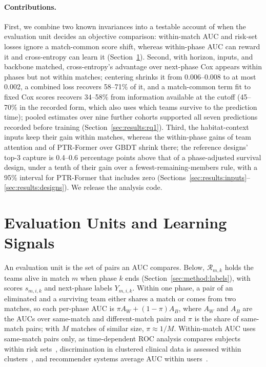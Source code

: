 \documentclass[sigconf,anonymous,nonacm]{acmart}
\begin{document}
\paragraph{Contributions.}
First, we combine two known invariances into a testable account of when the evaluation unit decides an objective comparison: within-match AUC and risk-set losses ignore a match-common score shift, whereas within-phase AUC can reward it and cross-entropy can learn it (Section~\ref{sec:account}). Second, with horizon, inputs, and backbone matched, cross-entropy's advantage over next-phase Cox appears within phases but not within matches; centering shrinks it from 0.006--0.008 to at most 0.002, a combined loss recovers 58--71\% of it, and a match-common term fit to fixed Cox scores recovers 34--58\% from information available at the cutoff (45--70\% in the recorded form, which also uses which teams survive to the prediction time); pooled estimates over nine further cohorts supported all seven predictions recorded before training (Section~\ref{sec:results:rq1}). Third, the habitat-context inputs keep their gain within matches, whereas the within-phase gains of team attention and of PTR-Former over GBDT shrink there; the reference designs' top-3 capture is 0.4--0.6 percentage points above that of a phase-adjusted survival design, under a tenth of their gain over a fewest-remaining-members rule, with a 95\% interval for PTR-Former that includes zero (Sections~\ref{sec:results:inputs}--\ref{sec:results:designs}). We release the analysis code.

\section{Evaluation Units and Learning Signals}
\label{sec:account}
An evaluation unit is the set of pairs an AUC compares. Below, $\mathcal{R}_{m,k}$ holds the teams alive in match $m$ when phase $k$ ends (Section~\ref{sec:method:labels}), with scores $s_{m,i,k}$ and next-phase labels $Y_{m,i,k}$. Within one phase, a pair of an eliminated and a surviving team either shares a match or comes from two matches, so each per-phase AUC is $\pi A_W+(1-\pi)A_B$, where $A_W$ and $A_B$ are the AUCs over same-match and different-match pairs and $\pi$ is the share of same-match pairs; with $M$ matches of similar size, $\pi\approx1/M$. Within-match AUC uses same-match pairs only, as time-dependent ROC analysis compares subjects within risk sets~\cite{HeagertyZheng05}, discrimination in clustered clinical data is assessed within clusters~\cite{vanKlaveren14}, and recommender systems average AUC within users~\cite{Zhou18}.
\end{document}
